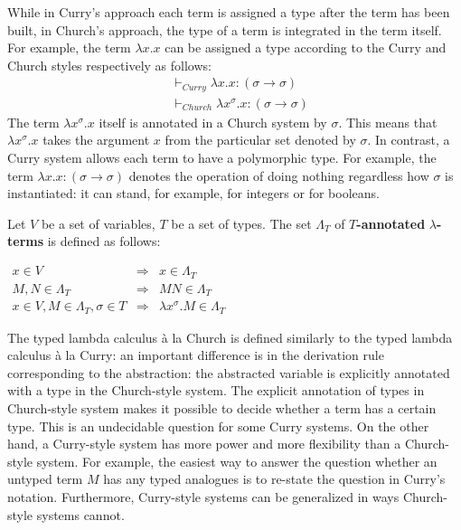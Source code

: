 While in Curry's approach each term is assigned a type after the term has been built, in Church's approach, the type of a term is integrated in the term itself. For example, the term $\lambda x.x$ can be assigned a type according to the Curry and Church styles respectively as follows:
\begin{align*}
& \vdash_{Curry} \lambda x.x: (\sigma \rightarrow \sigma) \\
& \vdash_{Church} \lambda x^\sigma.x: (\sigma \rightarrow \sigma) 
\end{align*}
The term $\lambda x^\sigma.x$ itself is annotated in a Church system by $\sigma$. This means that $\lambda x^\sigma.x$ takes the argument $x$ from the particular set denoted by $\sigma$. In contrast, a Curry system allows each term to have a polymorphic type. For example, the term $\lambda x.x:  (\sigma \rightarrow \sigma)$ denotes the operation of doing nothing regardless how $\sigma$ is instantiated: it can stand, for example, for integers or for booleans. 

\begin{definition} Let $V$ be a set of variables, $T$ be a set of types. The set $\Lambda_T$ of $T$\textbf{-annotated} $\lambda$\textbf{-terms} is defined as follows:
\begin{center}
$
\begin{array}{rcl}
x \in V & \Longrightarrow & x \in \Lambda_T \\
M, N \in  \Lambda_T& \Longrightarrow & MN \in \Lambda_T \\
x \in V, M \in \Lambda_T, \sigma \in T & \Longrightarrow & \lambda x^\sigma.M \in \Lambda_T
\end{array}
$
\end{center}
\end{definition}

The typed lambda calculus  \`{a} la Church is defined similarly to the typed lambda calculus  \`{a} la Curry: an important difference is in the derivation rule corresponding to the abstraction: the abstracted variable is explicitly annotated with a type in the Church-style system.
The explicit annotation of types in Church-style system makes it possible to decide whether a term has a certain type. This is an undecidable question for some Curry systems. On the other hand, a Curry-style system has more power and more flexibility than a Church-style system. For example, the easiest way to answer the question whether an untyped term $M$ has any typed analogues is to re-state the question in Curry's notation. Furthermore, Curry-style systems can be generalized in ways Church-style systems cannot. 

